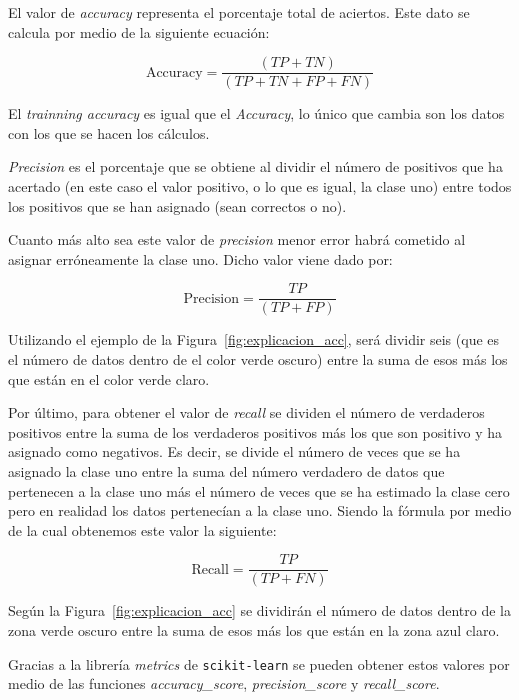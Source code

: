\documentclass[a4paper, 12pt]{book}
\begin{document}
El valor de \textit{accuracy} representa el porcentaje total de aciertos. Este dato se calcula por medio de la siguiente ecuación:

\begin{equation}
 \boxed{\mbox{Accuracy} = \frac{(TP + TN)}{(TP + TN + FP + FN)}}
\end{equation}

El \textit{trainning accuracy} es igual que el \textit{Accuracy}, lo único que cambia son los datos con los que se hacen los cálculos.

\textit{Precision} es el porcentaje que se obtiene al dividir el número de positivos que ha acertado (en este caso el valor positivo, o lo que es igual, la clase uno) entre todos los positivos que se han asignado (sean correctos o no). 

Cuanto más alto sea este valor de \textit{precision} menor error habrá cometido al asignar erróneamente la clase uno. Dicho valor viene dado por:

\begin{equation}
\label{eqn:accuracy} 
 \boxed{\mbox{Precision} = \frac{TP}{(TP + FP)}}
\end{equation}

Utilizando el ejemplo de la Figura~\ref{fig:explicacion_acc}, será dividir seis (que es el número de datos dentro de el color verde oscuro) entre la suma de esos más los que están en el color verde claro.

Por último, para obtener el valor de \textit{recall} se dividen el número de verdaderos positivos entre la suma de los verdaderos positivos más los que son positivo y ha asignado como negativos. Es decir, se divide el número de veces que se ha asignado la clase uno entre la suma del número verdadero de datos que pertenecen a la clase uno más el número de veces que se ha estimado la clase cero pero en realidad los datos pertenecían a la clase uno. Siendo la fórmula por medio de la cual obtenemos este valor la siguiente:

\begin{equation}
 \boxed{\mbox{Recall} = \frac{TP}{(TP + FN)}}
\end{equation}

Según la Figura~\ref{fig:explicacion_acc} se dividirán el número de datos dentro de la zona verde oscuro entre la suma de esos más los que están en la zona azul claro.

Gracias a la librería \textit{metrics} de \texttt{scikit-learn} se pueden obtener estos valores por medio de las funciones \textit{accuracy\_score}, \textit{precision\_score} y \textit{recall\_score}. 
\end{document}

